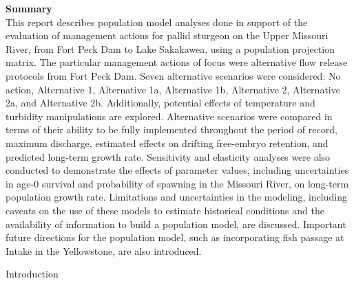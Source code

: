 \documentclass[12pt]{article}
\begin{document}
{\Large {\bf Summary}}\\
This report describes population model analyses done in support of the evaluation of management actions for pallid sturgeon on the Upper Missouri River, from Fort Peck Dam to Lake Sakakawea, using a population projection matrix.  The particular management actions of focus were alternative flow release protocols from Fort Peck Dam.  Seven alternative scenarios were considered:  No action, Alternative 1, Alternative 1a, Alternative 1b, Alternative 2, Alternative 2a, and Alternative 2b.  Additionally, potential effects of temperature and turbidity manipulations are explored.   Alternative scenarios were compared in terms of their ability to be fully implemented throughout the period of record, maximum discharge, estimated effects on drifting free-embryo retention, and predicted long-term growth rate.  Sensitivity and elasticity analyses were also conducted to demonstrate the effects of parameter values, including uncertainties in age-0 survival and probability of spawning in the Missouri River, on long-term population growth rate.  Limitations and uncertainties in the modeling, including caveats on the use of these models to estimate historical conditions and the availability of information to build a population model, are discussed.  Important future directions for the population model, such as incorporating fish passage at Intake in the Yellowstone, are also introduced.  

\begin{section}{Introduction}
\end{section}
\end{document}
